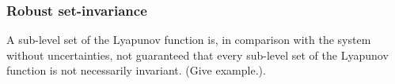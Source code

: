 \begin{figure}
  \centering
  
  \label{fig:sos-program-additive}
\end{figure}

\subsubsection{Robust set-invariance}

A sub-level set of the Lyapunov function is, in comparison with the system
without uncertainties, not guaranteed that every sub-level set of the Lyapunov
function is not necessarily invariant. (Give example.).

